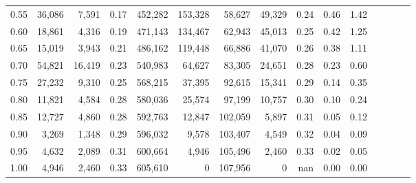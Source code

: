 \begin{tabular}{rrrcrrrrrrrrrrr}
0.55 &  36,086 &   7,591 &                                       0.17 &  452,282 &  153,328 &   58,627 &   49,329 &  0.24 &  0.46 &                         1.42 \\
0.60 &  18,861 &   4,316 &                                       0.19 &  471,143 &  134,467 &   62,943 &   45,013 &  0.25 &  0.42 &                         1.25 \\
0.65 &  15,019 &   3,943 &                                       0.21 &  486,162 &  119,448 &   66,886 &   41,070 &  0.26 &  0.38 &                         1.11 \\
0.70 &  54,821 &  16,419 &                                       0.23 &  540,983 &   64,627 &   83,305 &   24,651 &  0.28 &  0.23 &                         0.60 \\
0.75 &  27,232 &   9,310 &                                       0.25 &  568,215 &   37,395 &   92,615 &   15,341 &  0.29 &  0.14 &                         0.35 \\
0.80 &  11,821 &   4,584 &                                       0.28 &  580,036 &   25,574 &   97,199 &   10,757 &  0.30 &  0.10 &                         0.24 \\
0.85 &  12,727 &   4,860 &                                       0.28 &  592,763 &   12,847 &  102,059 &    5,897 &  0.31 &  0.05 &                         0.12 \\
0.90 &   3,269 &   1,348 &                                       0.29 &  596,032 &    9,578 &  103,407 &    4,549 &  0.32 &  0.04 &                         0.09 \\
0.95 &   4,632 &   2,089 &                                       0.31 &  600,664 &    4,946 &  105,496 &    2,460 &  0.33 &  0.02 &                         0.05 \\
1.00 &   4,946 &   2,460 &                                       0.33 &  605,610 &        0 &  107,956 &        0 &   nan &  0.00 &                         0.00 \\
\bottomrule
\end{tabular}

